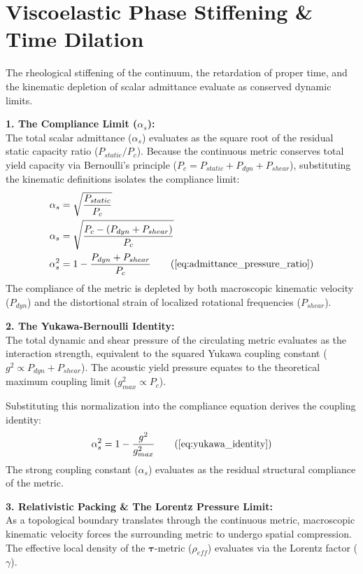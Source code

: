 \section{Viscoelastic Phase Stiffening \& Time Dilation}
\label{sec:deriv_viscoelastic_stiffening}

The rheological stiffening of the continuum, the retardation of proper time, and the kinematic depletion of scalar admittance evaluate as conserved dynamic limits. 

\textbf{1. The Compliance Limit ($\alpha_s$):} \\
The total scalar admittance ($\alpha_s$) evaluates as the square root of the residual static capacity ratio ($P_{static} / P_c$). Because the continuous metric conserves total yield capacity via Bernoulli's principle ($P_c = P_{static} + P_{dyn} + P_{shear}$), substituting the kinematic definitions isolates the compliance limit: 
\begin{align}
    \alpha_s &= \sqrt{\frac{P_{static}}{P_c}} \\ 
    \alpha_s &= \sqrt{\frac{P_c - (P_{dyn} + P_{shear})}{P_c}} \\ 
    \alpha_s^2 &= 1 - \frac{P_{dyn} + P_{shear}}{P_c} \tag{\ref{eq:admittance_pressure_ratio}}
\end{align}
The compliance of the metric is depleted by both macroscopic kinematic velocity ($P_{dyn}$) and the distortional strain of localized rotational frequencies ($P_{shear}$). 

\textbf{2. The Yukawa-Bernoulli Identity:} \\
The total dynamic and shear pressure of the circulating metric evaluates as the interaction strength, equivalent to the squared Yukawa coupling constant ($g^2 \propto P_{dyn} + P_{shear}$). The acoustic yield pressure equates to the theoretical maximum coupling limit ($g_{max}^2 \propto P_c$). 

Substituting this normalization into the compliance equation derives the coupling identity:
\begin{equation}
    \alpha_s^2 = 1 - \frac{g^2}{g_{max}^2} \tag{\ref{eq:yukawa_identity}}
\end{equation}
The strong coupling constant ($\alpha_s$) evaluates as the residual structural compliance of the metric. 

\textbf{3. Relativistic Packing \& The Lorentz Pressure Limit:} \\
As a topological boundary translates through the continuous metric, macroscopic kinematic velocity forces the surrounding metric to undergo spatial compression. The effective local density of the $\boldsymbol{\tau}$-metric ($\rho_{eff}$) evaluates via the Lorentz factor ($\gamma$). 

